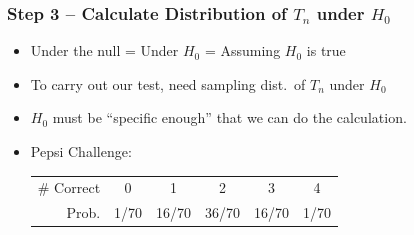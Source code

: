 \begin{frame}

  \frametitle{Step 3 -- Calculate Distribution of $T_n$ under $H_0$}

    \begin{itemize}
      \item \alert{Under the null = Under $H_0$ = Assuming $H_0$ is true} \pause
      \item To carry out our test, need sampling dist.\ of $T_n$ under $H_0$ \pause
      \item $H_0$ must be ``specific enough'' that we can do the calculation. 
      \item Pepsi Challenge:
        \vspace{1em}
            \begin{center}
              \begin{tabular}{rccccc}
                \hline
                \# Correct & 0 & 1 & 2 & 3 & 4\\
                Prob.&1/70 & 16/70 & 36/70 & 16/70 &1/70\\
                \hline
              \end{tabular}
            \end{center}
    \end{itemize}
    
  
\end{frame}
